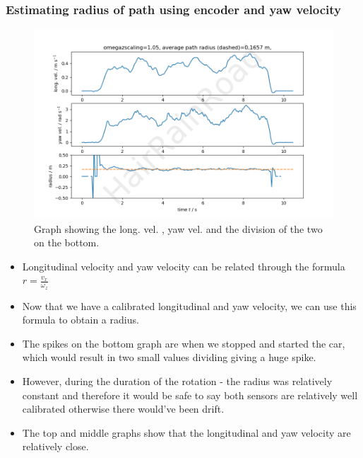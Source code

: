\documentclass[12pt]{article}
\begin{document}
    \subsubsection{Estimating radius of path using encoder and yaw velocity}
    \begin{figure}[H]
        \captionsetup{labelfont=bf}
        \includegraphics[width=40pc]{fig5png.png}
        \caption{Graph showing the long. vel. , yaw vel. and the division of the two on the bottom.}\label{figure5}
    \end{figure}
    \begin{itemize}
        \item Longitudinal velocity and yaw velocity can be related through the formula $r=\frac{v_x}{\omega_z}$
        \item Now that we have a calibrated longitudinal and yaw velocity, we can use this formula to obtain a radius.
        \item The spikes on the bottom graph are when we stopped and started the car, which would result in two small values dividing giving a huge spike.
        \item However, during the duration of the rotation - the radius was relatively constant and therefore it would be safe to say both sensors
        are relatively well calibrated otherwise there would've been drift.
        \item The top and middle graphs show that the longitudinal and yaw velocity are relatively close.
    \end{itemize}
    \newpage
\end{document}
